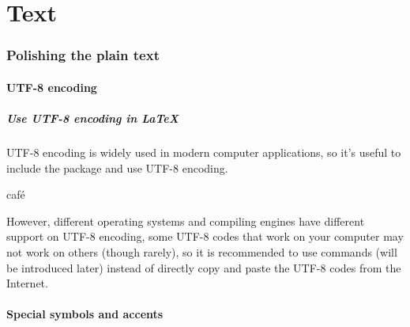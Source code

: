 \part{Text}

\section{Polishing the plain text}
\begin{frame}
\end{frame}

\subsection{UTF-8 encoding}

\begin{frame}[fragile]
	\frametitle{Use UTF-8 encoding in \LaTeX}
	UTF-8 encoding is widely used in modern computer applications, so it's useful to include the  package and use UTF-8 encoding.
	\begin{command}
		\texttt{\usepackage[utf-8]{inputenc}}
	\end{command}
	\begin{example}
		café
	\end{example}
	However, different operating systems and compiling engines have different support on UTF-8 encoding, some UTF-8 codes that work on your computer may not work on others (though rarely), so it is recommended to use commands (will be introduced later) instead of directly copy and paste the UTF-8 codes from the Internet.
\end{frame}

\subsection{Special symbols and accents}

